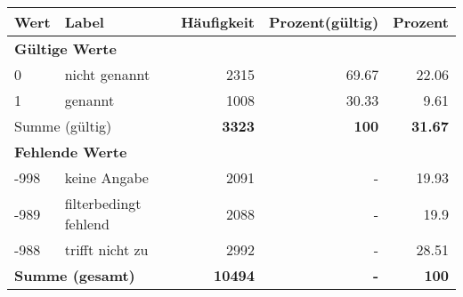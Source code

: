      \begin{longtable}{lXrrr}
     \toprule
     \textbf{Wert} & \textbf{Label} & \textbf{Häufigkeit} & \textbf{Prozent(gültig)} & \textbf{Prozent} \\
     \endhead
     \midrule
     \multicolumn{5}{l}{\textbf{Gültige Werte}}\\

     0 &
     \multicolumn{1}{X}{ nicht genannt   } &


       \num{2315} &
       \num[round-mode=places,round-precision=2]{69.67} &
         \num[round-mode=places,round-precision=2]{22.06} \\

     1 &
     \multicolumn{1}{X}{ genannt   } &


       \num{1008} &
       \num[round-mode=places,round-precision=2]{30.33} &
         \num[round-mode=places,round-precision=2]{9.61} \\
     \midrule
     \multicolumn{2}{l}{Summe (gültig)} &
       \textbf{\num{3323}} &
     \textbf{\num{100}} &
       \textbf{\num[round-mode=places,round-precision=2]{31.67}} \\
     \multicolumn{5}{l}{\textbf{Fehlende Werte}}\\
       -998 &
       keine Angabe &
         \num{2091} &
        - &
         \num[round-mode=places,round-precision=2]{19.93} \\
       -989 &
       filterbedingt fehlend &
         \num{2088} &
        - &
         \num[round-mode=places,round-precision=2]{19.9} \\
       -988 &
       trifft nicht zu &
         \num{2992} &
        - &
         \num[round-mode=places,round-precision=2]{28.51} \\
     \midrule
     \multicolumn{2}{l}{\textbf{Summe (gesamt)}} &
          \textbf{\num{10494}} &
        \textbf{-} &
        \textbf{\num{100}} \\
     \bottomrule
     \end{longtable}
     
